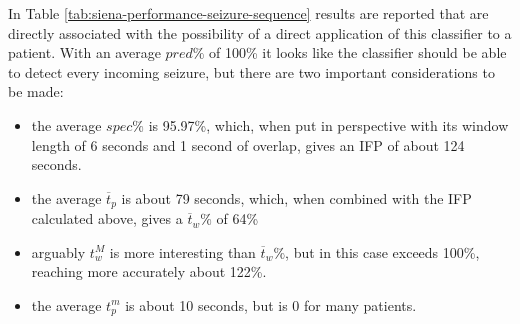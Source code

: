 In Table \ref{tab:siena-performance-seizure-sequence} results are reported that are directly associated with the possibility of a direct application of this classifier to a patient.
With an average $pred\%$ of 100\% it looks like the classifier should be able to detect every incoming seizure, but there are two important considerations to be made:
\begin{itemize}
    \item the average $spec\%$ is 95.97\%, which, when put in perspective with its window length of 6 seconds and 1 second of overlap, gives an \gls{IFP} of about 124 seconds.
    \item the average $\overline{t}_p$ is about 79 seconds, which, when combined with the \gls{IFP} calculated above, gives a $\overline{t}_w\%$ of 64\%
    \item arguably $t_w^M$ is more interesting than $\overline{t}_w\%$, but in this case exceeds 100\%, reaching more accurately about 122\%.
    \item the average $t_p^m$ is about 10 seconds, but is 0 for many patients.
\end{itemize}

